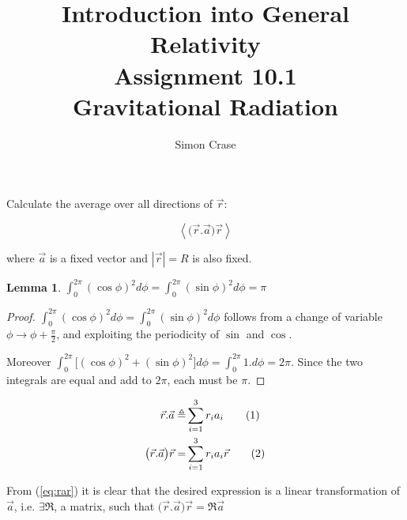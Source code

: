 \documentclass[]{article}
\title{Introduction into General Relativity\\Assignment 10.1\\Gravitational Radiation}
\author{Simon Crase}
\newcommand\numberthis{\addtocounter{equation}{1}\tag{\theequation}}
\newtheorem{lemma}{Lemma}
\begin{document}
\maketitle

Calculate the average over all directions of $\vec{r}$:

$$\left\langle \big(\vec{r}.\vec{a}\big)\vec{r} \right\rangle$$

where $\vec{a}$ is a fixed vector and $|\vec{r}|=R$ is also fixed.

\begin{lemma}\label{lemma:i1}
	$\int_{0}^{2\pi}(\cos\phi)^2  d\phi = \int_{0}^{2\pi}(\sin\phi)^2  d\phi=\pi$
\end{lemma}
\begin{proof}
	$\int_{0}^{2\pi}(\cos\phi)^2  d\phi = \int_{0}^{2\pi}(\sin\phi)^2  d\phi$ follows from a change of variable $\phi\rightarrow\phi+\frac{\pi}{2}$, and exploiting the periodicity of $\sin$ and $\cos$. 
	
	Moreover $\int_{0}^{2\pi}\big[(\cos\phi)^2  +(\sin\phi)^2\big] d\phi=\int_{0}^{2\pi}1. d\phi=2\pi$. Since the two integrals are equal and add to $2\pi$, each must be $\pi$.
\end{proof}
\begin{align*}
\vec{r}.\vec{a} \triangleq& \sum_{i=1}^{3}r_ia_i\numberthis\label{eq:ra}\\
\big(\vec{r}.\vec{a}\big)\vec{r} =& \sum_{i=1}^{3}r_ia_i \vec{r} \numberthis\label{eq:rar}
\end{align*}

From (\ref{eq:rar}) it is clear that the desired expression is a linear transformation of $\vec{a}$, i.e. $\exists \mathfrak{R}$, a matrix, such that $\big(\vec{r}.\vec{a}\big)\vec{r} =\mathfrak{R}\vec{a}$ 
\end{document}
